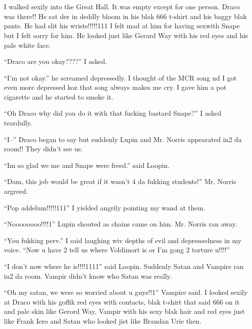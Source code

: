 \section{\chaptername~\thesection}



I walked sexily into the Great Hall. It was empty except for one person. Draco was there!! He sat der in deddly bloom in his blak 666 t-shirt and his baggy blak pants. He had slit his wrists!!!!!111 I felt mad at him for having sexwith Snape but I felt sorry for him. He looked just like Gerard Way with his red eyes and his pale white face.

\enquote{Draco are you okay????} I asked.

\enquote{I'm not okay.} he screamed depressedly. I thought of the MCR song nd I got even more depressed koz that song always makes me cry. I gave him a pot cigarette and he started to smoke it.

\enquote{Oh Draco why did you do it with that fucking bastard Snape?} I asked teardully.

\enquote{I--} Draco began to say but suddenly Lupin and Mr. Norris appearated in2 da room!! They didn't see us.

\enquote{Im so glad we me and Snape were freed.} said Loopin.

\enquote{Dam, this job would be great if it wasn't 4 da fukking students!} Mr. Norris argreed.

\enquote{Pop addelum!!!!!111} I yielded angrily pointing my wand at them.

\enquote{Noooooooo!!!!1} Lupin shouted as chains came on him. Mr. Norris ran away.

\enquote{You fukking perv.} I said laughing wiv depths of evil and depressedness in my voice. \enquote{Now u have 2 tell us where Voldimort is or I'm gong 2 torture u!!!!}

\enquote{I don't now where he is!!!!1111} said Loopin. Suddenly Satan and Vampire ran in2 da room. Vampir didn't know who Satan was really.

\enquote{Oh my satan, we were so worried about u guys!!1} Vampire said. I looked sexily at Draco with his goffik red eyes with contacts, blak t-shirt that said 666 on it and pale skin like Gerord Way, Vampir with his sexy blak hair and red eyes just like Frank Iero and Satan who looked jist like Brandan Urie then.

